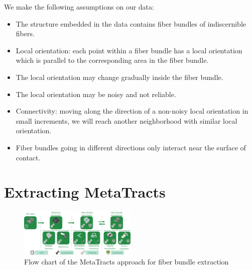 We make the following assumptions on our data:
\begin{itemize}[noitemsep]
\item The structure embedded in the data contains fiber bundles of indiscernible fibers.
\item Local orientation: each point within a fiber bundle has a local orientation which is parallel to the corresponding area in the fiber bundle.
\item The local orientation may change gradually inside the fiber bundle.
\item The local orientation may be noisy and not reliable.
\item Connectivity: moving along the direction of a non-noisy local orientation in small increments, we will reach another neighborhood with similar local orientation.
\item Fiber bundles going in different directions only interact near the surface of contact.
\end{itemize}



\section {Extracting MetaTracts }
\label{sec:approach}

\begin{figure}[t]
	\centering
\includegraphics[width=0.5\textwidth]{images_pvis/workflow.png}
\caption{Flow chart of the MetaTracts approach for fiber bundle extraction}
\label{fig:flowchart}
\end{figure}

